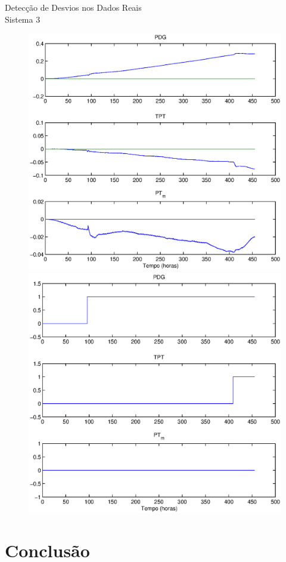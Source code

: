 \documentclass{beamer}
\begin{document}
\begin{frame}{Detecção de Desvios nos Dados Reais\\Sistema 3}
    \begin{figure}[bt]
        \centering\hspace*{-15pt}
        \includegraphics[trim=1.5cm .7cm 1.1cm .7cm,clip=true,width=.55\textwidth]{figuras/real_sys3_res_d1.eps}
        \includegraphics[trim=1.5cm .7cm 1.1cm .7cm,clip=true,width=.55\textwidth]{figuras/real_sys3_sprt_d1.eps}
    \end{figure}
\end{frame}

\section{Conclusão}
\subsection{}
\end{document}
